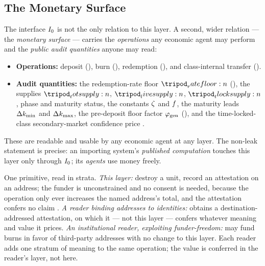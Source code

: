 \documentclass[../main.tex]{subfiles}
\begin{document}
\subsection{The Monetary Surface}
\label{sec:interface:monetary-surface}

The interface $I\sb{0}$ is not the only relation to this layer. A second, wider relation
--- the \emph{monetary surface} --- carries the \emph{operations} any economic agent may
perform and the \emph{public audit quantities} anyone may read:

\begin{itemize}[nosep]
    \item \textbf{Operations:} deposit (), burn
        (), redemption (), and
        class-internal transfer ().
    \item \textbf{Audit quantities:} the redemption-rate floor $\ratefloor{}$
        (), the supplies $\totsupply{}$, $\livesupply{}$,
        $\tlocksupply{}$, phase and maturity status, the constants $\zeta$ and
        $f$, the maturity leads $\Delta k\sb{\min}$ and $\Delta k\sb{\max}$, the pre-deposit floor
        factor $\varphi\sb{\mathrm{gen}}$ (), and
        the time-locked-class secondary-market confidence price \confprice{}.
\end{itemize}

These are readable and usable by any economic agent at any layer. The non-leak statement
is precise: an importing system's \emph{published computation} touches this layer only
through $I\sb{0}$; its \emph{agents} use money freely.

\begin{insight}
    \label{intuit:interface:two-relations}
    One primitive, read in strata. \emph{This layer:} destroy a \liveclass{} unit, record
    an attestation on an address; the funder is unconstrained and no consent is needed,
    because the operation only ever increases the named address's total, and the
    attestation confers no claim \atthislayer{}. \emph{A reader binding addresses to
    identities:} obtains a destination-addressed attestation, on which it --- not this
    layer --- confers whatever meaning and value it prices. \emph{An institutional reader,
    exploiting funder-freedom:} may fund burns in favor of third-party addresses with no
    change to this layer. Each reader adds one stratum of meaning to the same operation;
    the value is conferred in the reader's layer, not here.
\end{insight}
\end{document}
